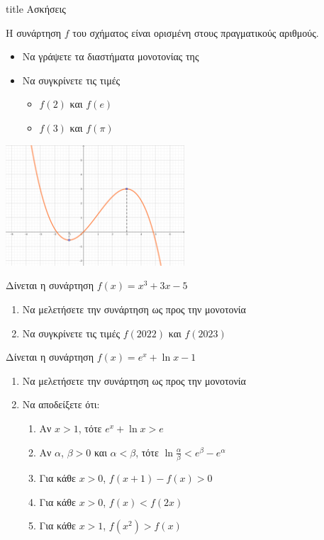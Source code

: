 \documentclass{presentation}
\begin{document}
\begin{frame}[noframenumbering]
  \vfill
  \centering
  \begin{beamercolorbox}[sep=8pt,center,shadow=true,rounded=true]{title}
    Ασκήσεις
  \end{beamercolorbox}
  \vfill
\end{frame}

\begin{askisi}
  Η συνάρτηση $f$ του σχήματος είναι ορισμένη στους πραγματικούς αριθμούς.
  \begin{itemize}
    \item Να γράψετε τα διαστήματα μονοτονίας της
    \item Να συγκρίνετε τις τιμές
          \begin{itemize}
            \item $f(2)$ και $f(e)$
            \item $f(3)$ και $f(\pi)$
          \end{itemize}
  \end{itemize}
  \centering
  \includegraphics[width=0.5\textwidth]{"images/1.3 Μονοτονία.png"}
\end{askisi}

\begin{askisi}
  Δίνεται η συνάρτηση $f(x)=x^3+3x-5$
  \begin{enumerate}
    \item Να μελετήσετε την συνάρτηση ως προς την μονοτονία \pause
    \item Να συγκρίνετε τις τιμές $f(2022)$ και $f(2023)$
  \end{enumerate}
\end{askisi}

\begin{askisi}
  Δίνεται η συνάρτηση $f(x)=e^x+\ln x-1$
  \begin{enumerate}
    \item Να μελετήσετε την συνάρτηση ως προς την μονοτονία \pause
    \item Να αποδείξετε ότι:
          \begin{enumerate}
            \item Αν $x>1$, τότε $e^x+\ln x>e$ \pause
            \item Αν $α$, $β>0$ και $α<β$, τότε $\ln \frac{α}{β}<e^β-e^α$ \pause
            \item Για κάθε $x>0$, $f(x+1)-f(x)>0$ \pause
            \item Για κάθε $x>0$, $f(x)<f(2x)$ \pause
            \item Για κάθε $x>1$, $f(x^2)>f(x)$
          \end{enumerate}
  \end{enumerate}
\end{askisi}
\end{document}
